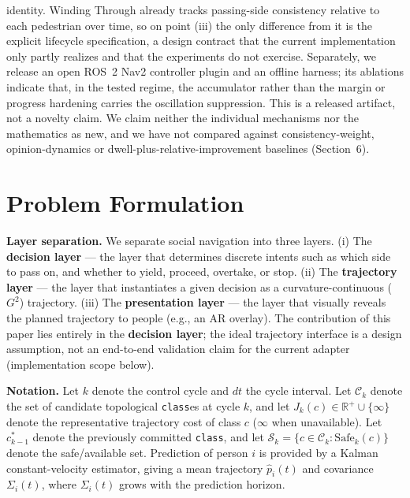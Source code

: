 \documentclass[11pt]{article}
\newcommand{\Class}{\texttt{class}}
\begin{document}
identity. Winding Through \cite{mavrogiannis2023winding} already tracks passing-side consistency relative to each pedestrian over time, so on point (iii) the only difference from it is the explicit lifecycle specification, a design contract that the current implementation only partly realizes and that the experiments do not exercise. Separately, we release an open ROS~2 Nav2 controller plugin and an offline harness; its ablations indicate that, in the tested regime, the accumulator rather than the margin or progress hardening carries the oscillation suppression. This is a released artifact, not a novelty claim. We claim neither the individual mechanisms nor the mathematics as new, and we have not compared against consistency-weight, opinion-dynamics or dwell-plus-relative-improvement baselines (Section~6).

\section{Problem Formulation}

\textbf{Layer separation.} We separate social navigation into three layers. (i) The \textbf{decision layer} --- the layer that determines discrete intents such as which side to pass on, and whether to yield, proceed, overtake, or stop. (ii) The \textbf{trajectory layer} --- the layer that instantiates a given decision as a curvature-continuous ($G^2$) trajectory. (iii) The \textbf{presentation layer} --- the layer that visually reveals the planned trajectory to people (e.g., an AR overlay). The contribution of this paper lies entirely in the \textbf{decision layer}; the ideal trajectory interface is a design assumption, not an end-to-end validation claim for the current adapter (implementation scope below).

\textbf{Notation.} Let $k$ denote the control cycle and $dt$ the cycle interval. Let $\mathcal{C}_k$ denote the set of candidate topological \Class{es} at cycle $k$, and let $J_k(c) \in \mathbb{R}^+ \cup \{\infty\}$ denote the representative trajectory cost of class $c$ ($\infty$ when unavailable). Let $c^*_{k-1}$ denote the previously committed \Class, and let $\mathcal{S}_k = \{c \in \mathcal{C}_k : \mathrm{Safe}_k(c)\}$ denote the safe/available set. Prediction of person $i$ is provided by a Kalman constant-velocity estimator, giving a mean trajectory $\hat p_i(t)$ and covariance $\Sigma_i(t)$, where $\Sigma_i(t)$ grows with the prediction horizon.
\end{document}
